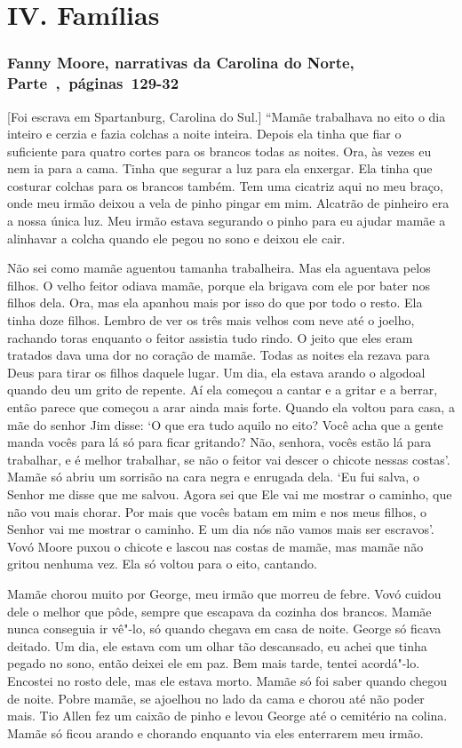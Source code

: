\chapter{IV. Famílias}

\subsection{Fanny Moore, narrativas da Carolina do Norte, Parte~,~páginas~129-32}
\label{ref194}

{[}Foi escrava em Spartanburg, Carolina do Sul.{]} ``Mamãe trabalhava no eito o dia inteiro e cerzia e fazia colchas a
noite inteira. Depois ela tinha que fiar o suficiente para quatro cortes
para os brancos todas as noites. Ora, às vezes eu nem ia para a cama.
Tinha que segurar a luz para ela enxergar. Ela tinha que costurar
colchas para os brancos também. Tem uma cicatriz aqui no meu braço, onde
meu irmão deixou a vela de pinho pingar em mim. Alcatrão de pinheiro era
a nossa única luz. Meu irmão estava segurando o pinho para eu ajudar
mamãe a alinhavar a colcha quando ele pegou no sono e deixou ele cair.

Não sei como mamãe aguentou tamanha trabalheira. Mas ela aguentava pelos
filhos. O velho feitor odiava mamãe, porque ela brigava com ele por
bater nos filhos dela. Ora, mas ela apanhou mais por isso do que por
todo o resto. Ela tinha doze filhos. Lembro de ver os três mais velhos
com neve até o joelho, rachando toras enquanto o feitor assistia tudo
rindo. O jeito que eles eram tratados dava uma dor no coração de mamãe.
Todas as noites ela rezava para Deus para tirar os filhos daquele lugar.
Um dia, ela estava arando o algodoal quando deu um grito de repente. Aí
ela começou a cantar e a gritar e a berrar, então parece que começou a
arar ainda mais forte. Quando ela voltou para casa, a mãe do senhor Jim
disse: `O que era tudo aquilo no eito? Você acha que a gente manda vocês
para lá só para ficar gritando? Não, senhora, vocês estão lá para
trabalhar, e é melhor trabalhar, se não o feitor vai descer o chicote
nessas costas'. Mamãe só abriu um sorrisão na cara negra e enrugada
dela. `Eu fui salva, o Senhor me disse que me salvou. Agora sei que Ele
vai me mostrar o caminho, que não vou mais chorar. Por mais que vocês
batam em mim e nos meus filhos, o Senhor vai me mostrar o caminho. E um
dia nós não vamos mais ser escravos'. Vovó Moore puxou o chicote e
lascou nas costas de mamãe, mas mamãe não gritou nenhuma vez. Ela só
voltou para o eito, cantando.

Mamãe chorou muito por George, meu irmão que morreu de febre. Vovó
cuidou dele o melhor que pôde, sempre que escapava da cozinha dos
brancos. Mamãe nunca conseguia ir vê"-lo, só quando chegava em casa de
noite. George só ficava deitado. Um dia, ele estava com um olhar tão
descansado, eu achei que tinha pegado no sono, então deixei ele em paz.
Bem mais tarde, tentei acordá"-lo. Encostei no rosto dele, mas ele estava
morto. Mamãe só foi saber quando chegou de noite. Pobre mamãe, se
ajoelhou no lado da cama e chorou até não poder mais. Tio Allen fez um
caixão de pinho e levou George até o cemitério na colina. Mamãe só ficou
arando e chorando enquanto via eles enterrarem meu irmão.

